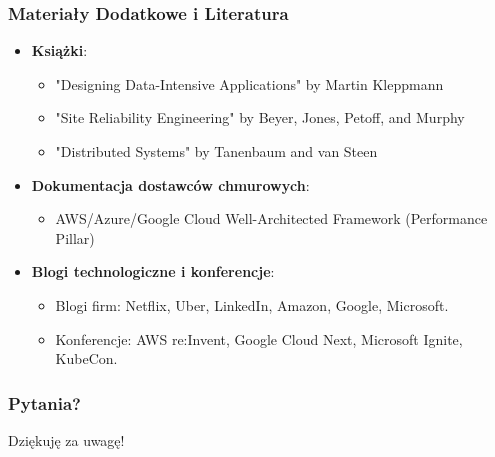 \documentclass[aspectratio=169,xcolor=table]{beamer}
\begin{document}
\begin{frame}
  \frametitle{Materiały Dodatkowe i Literatura}
  \begin{itemize}
    \item \textbf{Książki}:
        \begin{itemize}
            \item "Designing Data-Intensive Applications" by Martin Kleppmann
            \item "Site Reliability Engineering" by Beyer, Jones, Petoff, and Murphy
            \item "Distributed Systems" by Tanenbaum and van Steen
        \end{itemize}
    \item \textbf{Dokumentacja dostawców chmurowych}:
        \begin{itemize}
            \item AWS/Azure/Google Cloud Well-Architected Framework (Performance Pillar)
        \end{itemize}
    \item \textbf{Blogi technologiczne i konferencje}:
        \begin{itemize}
            \item Blogi firm: Netflix, Uber, LinkedIn, Amazon, Google, Microsoft.
            \item Konferencje: AWS re:Invent, Google Cloud Next, Microsoft Ignite, KubeCon.
        \end{itemize}
  \end{itemize}
\end{frame}

\begin{frame}
  \frametitle{Pytania?}
  \begin{center}
    Dziękuję za uwagę!
  \end{center}
\end{frame}
\end{document}
